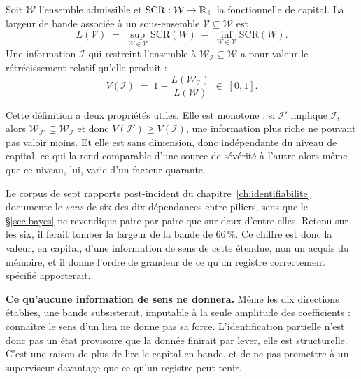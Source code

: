 \begin{definition}\label{def:voi}
Soit $\mathcal{W}$ l'ensemble admissible et $\mathrm{SCR}:\mathcal{W}\to\mathbb{R}_+$ la fonctionnelle de
capital. La largeur de bande associée à un sous-ensemble $\mathcal{V}\subseteq\mathcal{W}$ est
\begin{equation}
  L(\mathcal{V}) \;=\; \sup_{W\in\mathcal{V}}\mathrm{SCR}(W)\;-\;\inf_{W\in\mathcal{V}}\mathrm{SCR}(W).
  \label{eq:largeur-bande}
\end{equation}
Une information $\mathcal{I}$ qui restreint l'ensemble à $\mathcal{W}_{\mathcal{I}}\subseteq
\mathcal{W}$ a pour valeur le rétrécissement relatif qu'elle produit :
\begin{equation}
  V(\mathcal{I}) \;=\; 1-\frac{L(\mathcal{W}_{\mathcal{I}})}{L(\mathcal{W})} \;\in\;[0,1].
  \label{eq:voi}
\end{equation}
\end{definition}

Cette définition a deux propriétés utiles. Elle est monotone : si
$\mathcal{I}'$ implique $\mathcal{I}$, alors $\mathcal{W}_{\mathcal{I}'}\subseteq
\mathcal{W}_{\mathcal{I}}$ et donc $V(\mathcal{I}')\ge V(\mathcal{I})$, une information plus
riche ne pouvant pas valoir moins. Et elle est sans dimension, donc indépendante du
niveau de capital, ce qui la rend comparable d'une source de sévérité à l'autre alors même que
ce niveau, lui, varie d'un facteur quarante.

Le corpus de sept rapports post-incident du chapitre~\ref{ch:identifiabilite} documente le
\emph{sens} de six des dix dépendances entre piliers, sens que le \S\ref{sec:bayes} ne revendique
paire par paire que sur deux d'entre elles. Retenu sur les six, il ferait tomber la largeur de la
bande de $66\,\%$. Ce chiffre est donc la valeur, en capital, d'une information de sens de cette
étendue, non un acquis du mémoire, et il donne l'ordre de grandeur de ce qu'un registre
correctement spécifié apporterait.

\begin{attention}
\textbf{Ce qu'aucune information de sens ne donnera.} Même les dix directions établies, une bande
subsisterait, imputable à la seule amplitude des coefficients : connaître le sens d'un
lien ne donne pas sa force. L'identification partielle n'est donc pas un état provisoire que la
donnée finirait par lever, elle est structurelle. C'est une raison de plus de lire le
capital en bande, et de ne pas promettre à un superviseur davantage que ce qu'un registre peut
tenir.
\end{attention}

